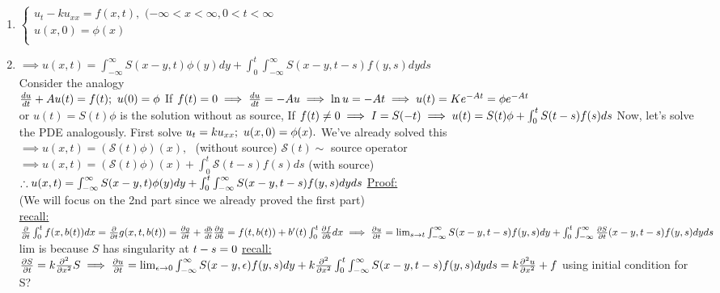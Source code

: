 \documentclass[12pt]{amsart}
\begin{document}
\begin{enumerate}
\item \underline{$
\begin{cases} 
	u_t-k u_{xx} = f(x,t),\,\, (-\infty < x < \infty, 0 < t < \infty\\
	u(x,0) = \phi(x)\\
\end{cases}$}\\
\item \underline{$\implies u(x,t) = \int_{-\infty}^{\infty} S(x-y,t) \phi(y) dy + \int_0^t \int_{-\infty}^{\infty} S(x-y,t-s) f(y,s) dyds$}\\
Consider the analogy \\
$\frac{du}{dt} + A u(t) = f(t);\,\, u(0) = \phi\\$
If $f(t)=0 \implies \frac{du}{dt} = - A u\\
\implies \ln u = - A t \implies u(t) = K e^{-At} = \phi e^{-At}$\\
or $u(t) = S(t) \phi$ is the solution without as source, If $f(t) \neq 0\\
\implies I = S(-t)\\
\implies u(t) = S(t) \phi + \int_0^t S(t-s) f(s) ds\\$
Now, let's solve the PDE analogously. First solve $u_t = k u_{xx};\,\, u(x,0) = \phi(x).\\$
We've already solved this\\
$\implies u(x,t) = (\mathcal{S}(t) \phi)(x),\,\,$ (without source) $\mathcal{S}(t) \sim$ source operator\\
$\implies u(x,t) = (\mathcal{S}(t) \phi)(x) + \int_0^t \mathcal{S} (t-s) f(s) ds$ (with source)\\
$\therefore u(x,t) = \int_{-\infty}^{\infty} S(x-y,t) \phi(y) dy + \int_0^t \int_{-\infty}^{\infty} S(x-y,t-s) f(y,s) dy ds\\$
\underline{Proof:}\\
(We will focus on the 2nd part since we already proved the first part)\\
\underline{recall:} $\frac{\partial}{\partial t} \int_0^t f(x,b(t)) dx = \frac{\partial}{\partial t} g(x,t,b(t))\\
= \frac{\partial g}{\partial t} + \frac{d b}{dt} \frac{\partial g}{\partial b} = f(t,b(t)) + b'(t) \int_0^t \frac{\partial f}{\partial b} dx\\
\implies \frac{\partial u}{\partial t} = \lim_{s \rightarrow t} \int_{-\infty}^{\infty} S(x-y,t-s) f(y,s) dy + \int_0^t \int_{-\infty}^{\infty} \frac{\partial S}{\partial t} (x-y,t-s) f(y,s) dy ds\\$
lim is because $S$ has singularity at $t-s = 0\\$
\underline{recall:} $\frac{\partial S}{\partial t} = k \frac{\partial^2}{\partial x^2} S\\
\implies \frac{\partial u}{\partial t} = \lim_{\epsilon \rightarrow 0} \int_{- \infty}^{\infty} S(x-y,\epsilon) f(y,s) dy + k \frac{\partial^2}{\partial x^2} \int_0^t \int_{-\infty}^{\infty} S(x-y,t-s) f(y,s) dy ds\\
=k \frac{\partial^2 u}{\partial x^2} + f$ using initial condition for S?



\end{enumerate}
\end{document}

